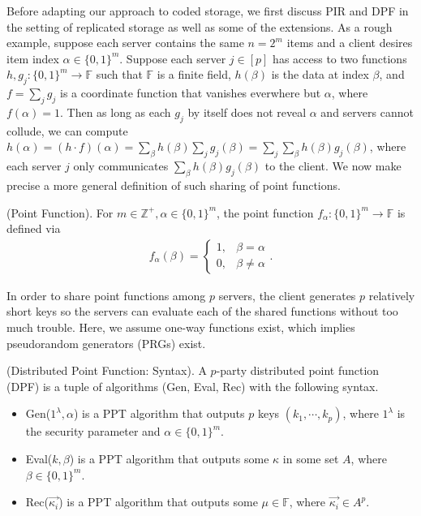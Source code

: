 \documentclass[11pt]{article}
\newcommand{\Gen}{\textsf{Gen}}
\newcommand{\Eval}{\textsf{Eval}}
\newcommand{\Rec}{\textsf{Rec}}
\begin{document}
Before adapting our approach to coded storage, we first discuss PIR and DPF in the setting of replicated storage as well as some of the extensions. As a rough example, suppose each server contains the same $n = 2^m$ items and a client desires item index $\alpha \in \{0,1\}^m$. Suppose each server $j \in [p]$ has access to two functions $h,g_j : \{0,1\}^m \to \mathbb{F}$ such that $\mathbb{F}$ is a finite field, $h(\beta)$ is the data at index $\beta$, and $f = \sum_j g_j$ is a coordinate function that vanishes everwhere but $\alpha$, where $f(\alpha) = 1$. Then as long as each $g_j$ by itself does not reveal $\alpha$ and servers cannot collude, we can compute $h(\alpha) = (h \cdot f)(\alpha) = \sum_\beta h(\beta) \sum_j g_j(\beta) = \sum_j \sum_\beta h(\beta)g_j(\beta)$, where each server $j$ only communicates $\sum_\beta h(\beta)g_j(\beta)$ to the client. We now make precise a more general definition of such sharing of point functions.
\begin{definition}
(Point Function). For $m \in \mathbb{Z}^+, \alpha \in \{0,1\}^m$, the point function $f_{\alpha} : \{0,1\}^m \to \mathbb{F}$ is defined via
\begin{align*}
  f_{\alpha}(\beta) = \begin{cases}
  1, &\beta = \alpha\\
  0, &\beta \neq \alpha
  \end{cases}.
\end{align*}
\end{definition}
In order to share point functions among $p$ servers, the client generates $p$ relatively short keys so the servers can evaluate each of the shared functions without too much trouble. Here, we assume one-way functions exist, which implies pseudorandom generators (PRGs) exist.
\begin{definition}
(Distributed Point Function: Syntax). A $p$-party distributed point function (DPF) is a tuple of algorithms (\Gen, \Eval, \Rec) with the following syntax.
\begin{itemize}
  \item \Gen($1^\lambda, \alpha$) is a PPT algorithm that outputs $p$ keys $(k_1, \cdots, k_p)$, where $1^\lambda$ is the security parameter and $\alpha \in \{0,1\}^m$.
  \item \Eval($k, \beta$) is a PPT algorithm that outputs some $\kappa$ in some set $A$, where $\beta \in \{0,1\}^m$.
  \item \Rec($\overrightarrow{\kappa_i}$) is a PPT algorithm that outputs some $\mu \in \mathbb{F}$, where $\overrightarrow{\kappa_i} \in A^p$.
\end{itemize}
\end{definition}
\end{document}
